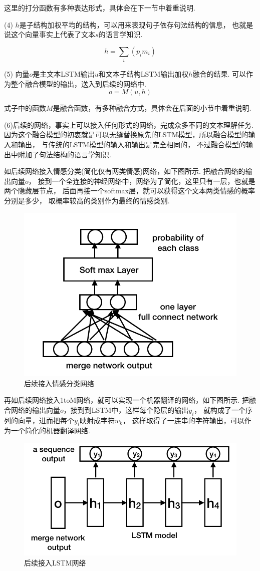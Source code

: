 \documentclass[bachelor,winfonts]{jnuthesis}
\begin{document}
这里的打分函数有多种表达形式，具体会在下一节中着重说明.

(4)
$h$是子结构加权平均的结构，可以用来表现句子依存句法结构的信息，
也就是说这个向量事实上代表了文本$s$的语言学知识.

\begin{equation}
  h = \sum_{i}(p_{i}m_{i})
\end{equation}

(5)
向量$o$是主文本LSTM输出$u$和文本子结构LSTM输出加权$h$融合的结果.
可以作为整个融合模型的输出，送入到后续的网络中.
\begin{equation}
  o = M(u,h)
\end{equation}

式子中的函数$M$是融合函数，有多种融合方式，具体会在后面的小节中着重说明.

(6)后续的网络，事实上可以接入任何形式的网络，完成众多不同的文本理解任务.
因为这个融合模型的初衷就是可以无缝替换原先的LSTM模型，所以融合模型的输入和输出，
与传统的LSTM模型的输入和输出是完全相同的，
不过融合模型的输出中附加了句法结构的语言学知识.

如后续网络接入情感分类(简化仅有两类情感)网络，如下图所示.
把融合网络的输出向量$o$，
接到一个全连接的神经网络中，网络为了简化，这里只有一层，也就是两个隐藏层节点，
后面再接一个softmax层，就可以获得这个文本两类情感的概率分别是多少，
取概率较高的类别作为最终的情感类别.
\begin{figure}[h!]
  \centering
  \includegraphics[width=0.5\linewidth]{二分类.png}
  \caption{后续接入情感分类网络}
\end{figure}

再如后续网络接入1toM网络，就可以实现一个机器翻译的网络，如下图所示.
把融合网络的输出向量$o$，接到到LSTM中，这样每个隐层的输出$y_{i}$，
就构成了一个序列的向量，进而把每个$y_{i}$映射成字符$w_{k}$，
这样取得了一连串的字符输出，可以作为一个简化的机器翻译网络.

\begin{figure}[h!]
  \centering
  \includegraphics[width=0.5\linewidth]{机器翻译例子.png}
  \caption{后续接入LSTM网络}
\end{figure}
\end{document}
